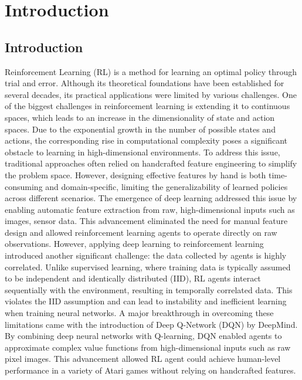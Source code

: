 

\chapter{Introduction}\label{chapter1}
\section{Introduction} \label{chap1:sec1}

Reinforcement Learning (RL) \cite{RL} is a method for learning an optimal policy through trial and error.
Although its theoretical foundations have been established for several decades, its practical applications were limited by various challenges.
One of the biggest challenges in reinforcement learning is extending it to continuous spaces, which leads to an increase in the dimensionality of state and action spaces.
Due to the exponential growth in the number of possible states and actions, the corresponding rise in computational complexity poses a significant obstacle to learning in high-dimensional environments.
To address this issue, traditional approaches often relied on handcrafted feature engineering to simplify the problem space.
However, designing effective features by hand is both time-consuming and domain-specific, limiting the generalizability of learned policies across different scenarios.
The emergence of deep learning addressed this issue by enabling automatic feature extraction from raw, high-dimensional inputs such as images, sensor data.
This advancement eliminated the need for manual feature design and allowed reinforcement learning agents to operate directly on raw observations.
However, applying deep learning to reinforcement learning introduced another significant challenge: the data collected by agents is highly correlated.
Unlike supervised learning, where training data is typically assumed to be independent and identically distributed (IID), RL agents interact sequentially with the environment, resulting in temporally correlated data.
This violates the IID assumption and can lead to instability and inefficient learning when training neural networks.
A major breakthrough in overcoming these limitations came with the introduction of Deep Q-Network (DQN) \cite{DQN1, DQN2} by DeepMind.
By combining deep neural networks with Q-learning, DQN enabled agents to approximate complex value functions from high-dimensional inputs such as raw pixel images.
This advancement allowed RL agent could achieve human-level performance in a variety of Atari games without relying on handcrafted features.
